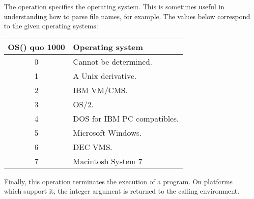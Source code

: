 The  operation specifies the operating system.
This is sometimes useful in understanding how to parse file names,
for example.
The values below correspond to the given operating systems:

\begin{tabular}{cl}
OS() quo 1000 & Operating system \\
\hline
0 & Cannot be  determined. \\
1 & A Unix derivative. \\
2 & IBM VM/CMS. \\
3 & OS/2. \\
4 & DOS for IBM PC compatibles. \\
5 & Microsoft Windows. \\
6 & DEC VMS. \\
7 & Macintosh System 7
\end{tabular}

Finally, this operation terminates the execution of a program.
On platforms which support it, the integer argument is returned
to the calling environment.
